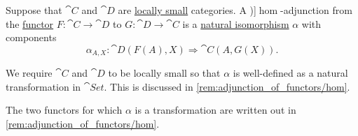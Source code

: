 \begin{definition}\label{def:hom_adjunction}
  Suppose that \( \cat{C} \) and \( \cat{D} \) are \hyperref[def:small_category]{locally small} categories. A \term[en=adjunction (\cite[def. 4.1.1]{Perrone2024StartingCategoryTheory})]{\( \hom \)-adjunction} from the \hyperref[def:functor]{functor} \( F: \cat{C} \to \cat{D} \) to \( G: \cat{D} \to \cat{C} \) is a \hyperref[thm:natural_isomorphism]{natural isomorphism} \( \alpha \) with components
  \begin{equation}\label{eq:def:hom_adjunction}
    \alpha_{A,X}: \cat{D}(F(A), X) \Rightarrow \cat{C}(A, G(X)).
  \end{equation}
\end{definition}
\begin{comments}
  \item We require \( \cat{C} \) and \( \cat{D} \) to be locally small so that \( \alpha \) is well-defined as a natural transformation in \( \cat{Set} \). This is discussed in \cref{rem:adjunction_of_functors/hom}.

  \item The two functors for which \( \alpha \) is a transformation are written out in \cref{rem:adjunction_of_functors/hom}.
\end{comments}

